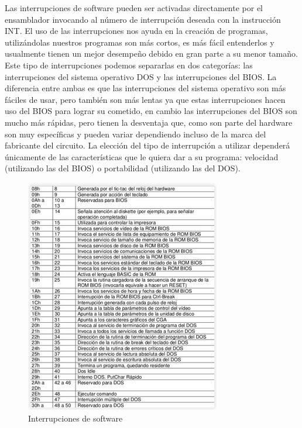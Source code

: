 \documentclass{article}
\begin{document}
Las interrupciones de software pueden ser activadas directamente por el ensamblador invocando al número de interrupción deseada con la instrucción INT.
El uso de las interrupciones nos ayuda en la creación de programas, utilizándolas nuestros programas son más cortos, es más fácil entenderlos y usualmente tienen un mejor desempeño debido en gran parte a su menor tamaño.
Este tipo de interrupciones podemos separarlas en dos categorías: las interrupciones del sistema operativo DOS y las interrupciones del BIOS.
La diferencia entre ambas es que las interrupciones del sistema operativo son más fáciles de usar, pero también son más lentas ya que estas interrupciones hacen uso del BIOS para lograr su cometido, en cambio las interrupciones del BIOS son mucho más rápidas, pero tienen la desventaja que, como son parte del hardware son muy específicas y pueden variar dependiendo incluso de la marca del fabricante del circuito.
La elección del tipo de interrupción a utilizar dependerá únicamente de las características que le quiera dar a su programa: velocidad (utilizando las del BIOS) o portabilidad (utilizando las del DOS).

\begin{figure}[h]
\centering
\includegraphics[scale=1.2]{interrupciones2}
\caption{Interrupciones de software \cite{interHS}}
\label{fig:interrupciones2}
\end{figure}
\end{document}
